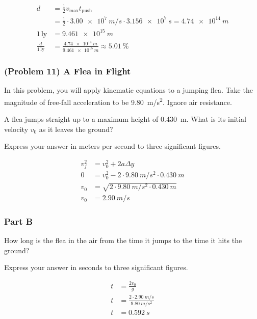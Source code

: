 \begin{solution}
	\begin{align*}
		d &= \frac{1}{2} v_{\mathrm{max}} t_{\mathrm{push}} \\
		&= \frac{1}{2} \cdot \SI{3.00e7}{m/s} \cdot \SI{3.156e7}{s} = \SI{4.74e14}{m} \\
		1 \, \mathrm{ly} &= \SI{9.461e15}{m} \\
		\frac{d}{1 \, \mathrm{ly}} &= \frac{\SI{4.74e14}{m}}{\SI{9.461e15}{m}} \approx \SI{5.01}{\percent}
	\end{align*}
\end{solution}

\newpage

\subsubsection{(Problem 11) A Flea in Flight}
In this problem, you will apply kinematic equations to a jumping flea. Take the magnitude of free-fall acceleration to be \SI{9.80}{m/s^2}. Ignore air resistance.

A flea jumps straight up to a maximum height of \SI{0.430}{m}. What is its initial velocity $v_0$ as it leaves the ground?

Express your answer in meters per second to three significant figures.

\begin{solution}
	\begin{align*}
		v_f^2 &= v_0^2 + 2a \Delta y \\
		0 &= v_0^2 - 2 \cdot \SI{9.80}{m/s^2} \cdot \SI{0.430}{m} \\
		v_0 &= \sqrt{2 \cdot \SI{9.80}{m/s^2} \cdot \SI{0.430}{m}} \\
		v_0 &= \SI{2.90}{m/s}
	\end{align*}
\end{solution}

\subsubsection{Part B}
How long is the flea in the air from the time it jumps to the time it hits the ground?

Express your answer in seconds to three significant figures.

\begin{solution}
	\begin{align*}
		t &= \frac{2v_0}{g} \\
		t &= \frac{2 \cdot \SI{2.90}{m/s}}{\SI{9.80}{m/s^2}} \\
		t &= \SI{0.592}{s}
	\end{align*}
\end{solution}

